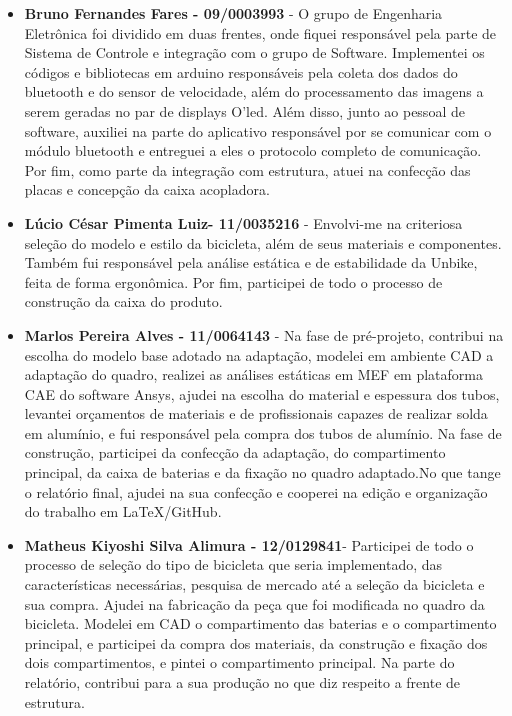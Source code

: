 \begin{apendicesenv}
\begin{itemize}
		\item \textbf{Bruno Fernandes Fares - 09/0003993} - O grupo de Engenharia Eletrônica foi dividido em duas frentes, onde fiquei responsável pela parte de Sistema de Controle e integração com o grupo de Software. Implementei os códigos e bibliotecas em arduino responsáveis pela coleta dos dados do bluetooth e do sensor de velocidade, além do processamento das imagens a serem geradas no par de displays O’led. Além disso, junto ao pessoal de software, auxiliei na parte do aplicativo responsável por se comunicar com o módulo bluetooth e entreguei a eles o protocolo completo de comunicação. Por fim, como parte da integração com estrutura, atuei na confecção das placas e concepção da caixa acopladora.
		
		\item \textbf{Lúcio César Pimenta Luiz- 11/0035216 }- Envolvi-me na criteriosa seleção do modelo e estilo da bicicleta, além de seus materiais e componentes. Também fui responsável pela análise estática e de estabilidade da Unbike, feita de forma ergonômica.
		Por fim, participei de todo o processo de construção da caixa do produto.
		
		\item \textbf{Marlos Pereira Alves - 11/0064143} - Na fase de pré-projeto, contribui na escolha do modelo base  adotado na adaptação, modelei em ambiente CAD a adaptação do quadro, realizei as análises estáticas em MEF em plataforma CAE do software Ansys, ajudei na escolha do material e espessura dos tubos, levantei orçamentos de materiais e de profissionais capazes de realizar solda em alumínio, e fui responsável pela compra dos tubos de alumínio. Na fase de construção, participei da confecção da adaptação, do compartimento principal, da caixa de baterias e da fixação no quadro adaptado.No que tange o relatório final, ajudei na sua confecção e cooperei na edição e organização do trabalho em LaTeX/GitHub.
		
		\item\textbf{ Matheus Kiyoshi Silva Alimura - 12/0129841}- Participei de todo o processo de seleção do tipo de bicicleta que seria implementado, das características necessárias, pesquisa de mercado até a seleção da bicicleta e sua compra. Ajudei na fabricação da peça que foi modificada no quadro da bicicleta. Modelei em CAD o compartimento das baterias e o compartimento principal, e participei da compra dos materiais, da construção e fixação dos dois compartimentos, e pintei o compartimento principal. Na parte do relatório, contribui para a sua produção no que diz respeito a frente de estrutura.
		

\end{itemize}
\end{apendicesenv}
